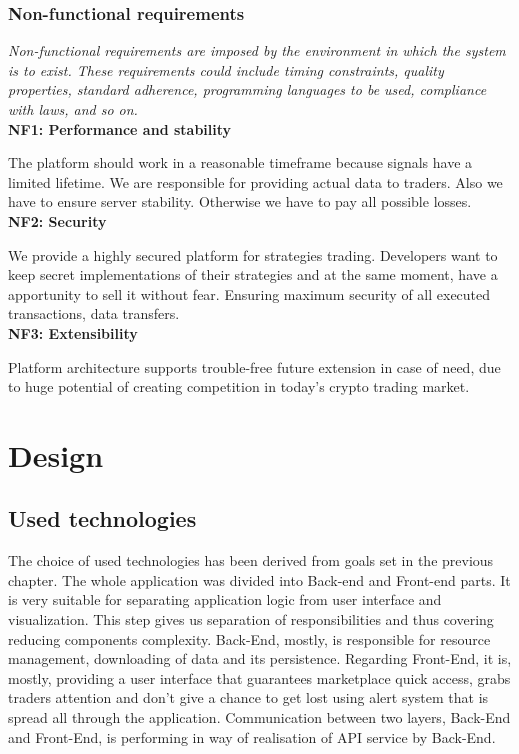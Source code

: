 \documentclass[thesis=B,english]{FITthesis}[2019/03/06]
\begin{document}
\subsection{Non-functional requirements}

\textit{Non-functional requirements are imposed by the environment in which the system is to exist. These requirements could include timing constraints, quality properties, standard adherence, programming languages to be used, compliance with laws, and so on.} \cite[p.~47--48]{laplante} \\

\noindent \textbf{NF1: Performance and stability} \label{nf:1}

\noindent The platform should work in a reasonable timeframe because signals have a limited lifetime. We are responsible for providing actual data to traders. Also we have to ensure server stability. Otherwise we have to pay all possible losses.\\

\noindent \textbf{NF2: Security} \label{nf:2}

\noindent We provide a highly secured platform for strategies trading. Developers want to keep secret implementations of their strategies and at the same moment, have a apportunity to sell it without fear. Ensuring maximum security of all executed transactions, data transfers. \\

\noindent \textbf{NF3: Extensibility} \label{nf:3}

\noindent Platform architecture supports trouble-free future extension in case of need, due to huge potential of creating competition in today’s crypto trading market. \\



\chapter{Design}
\section{Used technologies}
The choice of used technologies has been derived from goals set in the previous chapter. The whole application was divided into Back-end and Front-end parts. It is very suitable for separating application logic from user interface and visualization. 
This step gives us separation of responsibilities and thus covering reducing components complexity.
Back-End, mostly, is responsible for resource management, downloading of data and its persistence.
Regarding Front-End, it is, mostly,  providing a user interface that guarantees marketplace quick access, grabs traders attention and don't give a chance to get lost using alert system that is spread all through the application.
Communication between two layers, Back-End and Front-End, is performing in way of realisation of API service by Back-End.
\end{document}
